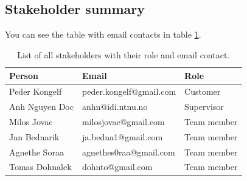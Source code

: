 \subsection{Stakeholder summary}
You can see the table with email contacts in table \ref{tab:stakeholders_summary}.

\begin{table}[!ht]\centering
\caption{List of all stakeholders with their role and email contact. }
\label{tab:stakeholders_summary}
\def\arraystretch{1.15}
\begin{tabular}{lll}
\toprule[1mm]
\textbf{Person} & \textbf{Email} & \textbf{Role}\\
\midrule
Peder Kongelf & peder.kongelf@gmail.com  & Customer\\
\midrule
Anh Nguyen Doc	 & anhn@idi.ntnu.no & Supervisor \\
\midrule
Milos Jovac &  milosjovac@gmail.com & Team member  \\
Jan Bednarik &  ja.bedna1@gmail.com & Team member\\
Agnethe Soraa & agnethes0raa@gmail.com & Team member  \\
Tomas Dohnalek & dohnto@gmail.com & Team member \\
\bottomrule[1mm]
\end{tabular}
\end{table}